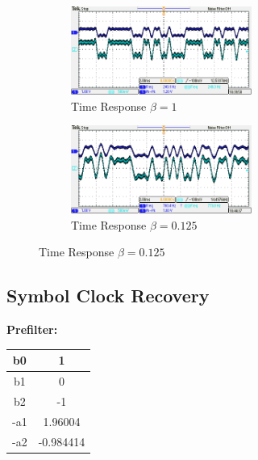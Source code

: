 \documentclass{article}
\begin{document}
\begin{figure}[h]
  \begin{center}

    \begin{subfigure}[b]{0.5\linewidth}
			\includegraphics[width=0.65\textwidth]{img/DSK_implementation_beta_1.png}
      \caption{Time Response $\beta = 1$}
    \end{subfigure}

    \begin{subfigure}[b]{0.5\linewidth}
			\includegraphics[width=0.65\textwidth]{img/DSK_implementation_beta_125.png}
      \caption{Time Response $\beta = 0.125$}
    \end{subfigure}

  \end{center}
\end{figure}

\subsection{Symbol Clock Recovery}

\textbf{Prefilter:}

\begin{center}
\begin{tabular}{c|c}
b0	&	 1				\\ \hline
b1	&  0				\\ \hline
b2	& -1				\\ \hline
-a1	&	 1.96004	\\ \hline
-a2	&	-0.984414
\end{tabular}
\end{center}
\end{document}
